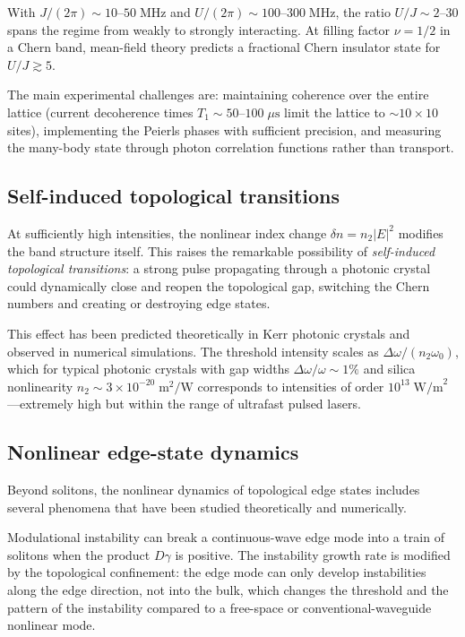 With $J/(2\pi)\sim 10$--$50\;\mathrm{MHz}$ and
$U/(2\pi)\sim 100$--$300\;\mathrm{MHz}$, the ratio $U/J\sim 2$--$30$
spans the regime from weakly to strongly interacting.  At filling
factor $\nu=1/2$ in a Chern band, mean-field theory predicts a
fractional Chern insulator state for $U/J\gtrsim 5$.

The main experimental challenges are: maintaining coherence over the
entire lattice (current decoherence times $T_1\sim 50$--$100\;
\mu\mathrm{s}$ limit the lattice to $\sim 10\times 10$ sites),
implementing the Peierls phases with sufficient precision, and
measuring the many-body state through photon correlation functions
rather than transport.

\subsection{Self-induced topological transitions}
\label{sec:ch18-self-induced}

At sufficiently high intensities, the nonlinear index change
$\delta n=n_2|E|^2$ modifies the band structure itself.  This raises the
remarkable possibility of \emph{self-induced topological transitions}:
a strong pulse propagating through a photonic crystal could dynamically
close and reopen the topological gap, switching the Chern numbers and
creating or destroying edge states.

This effect has been predicted theoretically in Kerr photonic crystals
and observed in numerical simulations.  The threshold intensity scales
as $\Delta\omega/(n_2\omega_0)$, which for typical photonic crystals
with gap widths $\Delta\omega/\omega\sim 1\%$ and silica nonlinearity
$n_2\sim 3\times 10^{-20}\;\mathrm{m}^2/\mathrm{W}$ corresponds to
intensities of order $10^{13}\;\mathrm{W/m}^2$---extremely high but
within the range of ultrafast pulsed lasers.

\subsection{Nonlinear edge-state dynamics}
\label{sec:ch18-nl-dynamics}

Beyond solitons, the nonlinear dynamics of topological edge states
includes several phenomena that have been studied theoretically and
numerically.

Modulational instability can break a continuous-wave edge mode into a
train of solitons when the product $D\gamma$ is positive.  The
instability growth rate is modified by the topological confinement:
the edge mode can only develop instabilities along the edge direction,
not into the bulk, which changes the threshold and the pattern of the
instability compared to a free-space or conventional-waveguide
nonlinear mode.

